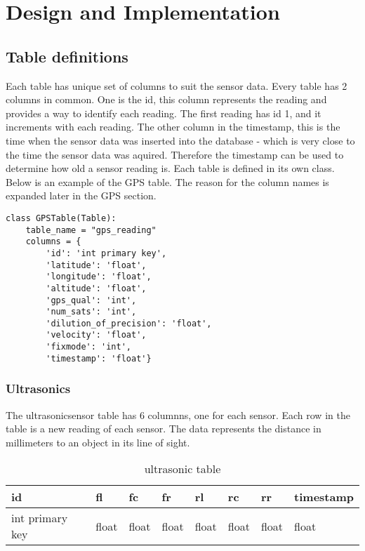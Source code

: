 \section{Design and Implementation}

\subsection{Table definitions}
Each table has unique set of columns to suit the sensor data.
Every table has 2 columns in common. One is the id, this column represents the reading and provides a way to identify each reading. The first reading has id 1, and it increments with each reading. The other column in the timestamp, this is the time when the sensor data was inserted into the database - which is very close to the time the sensor data was aquired. Therefore the timestamp can be used to determine how old a sensor reading is. 
\newline
Each table is defined in its own class.
Below is an example of the GPS table. The reason for the column names is expanded later in the GPS section.
\begin{lstlisting}     
class GPSTable(Table):
    table_name = "gps_reading"
    columns = {
        'id': 'int primary key',
        'latitude': 'float',
        'longitude': 'float',
        'altitude': 'float',
        'gps_qual': 'int',
        'num_sats': 'int',
        'dilution_of_precision': 'float',
        'velocity': 'float',
        'fixmode': 'int',
        'timestamp': 'float'}
\end{lstlisting} 


\subsubsection{Ultrasonics}
The \gls{ultrasonicsensor} table has 6 columnns, one for each sensor. Each row in the table is a new reading of each sensor. The data represents the distance in millimeters to an object in its line of sight.  
\begin{table}[!htb]
\centering
\caption{ultrasonic table}
\label{my-label}
\begin{tabular}{@{}llllllll@{}}
\toprule
id              & fl    & fc    & fr    & rl    & rc    & rr    & timestamp \\ \midrule
int primary key & float & float & float & float & float & float & float    
\end{tabular}
\end{table}

